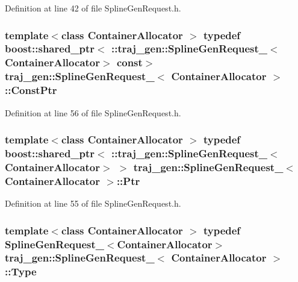 Definition at line 42 of file Spline\+Gen\+Request.\+h.

\subsubsection[{\texorpdfstring{Const\+Ptr}{ConstPtr}}]{\setlength{\rightskip}{0pt plus 5cm}template$<$class Container\+Allocator $>$ typedef boost\+::shared\+\_\+ptr$<$ \+::{\bf traj\+\_\+gen\+::\+Spline\+Gen\+Request\+\_\+}$<$Container\+Allocator$>$ const$>$ {\bf traj\+\_\+gen\+::\+Spline\+Gen\+Request\+\_\+}$<$ Container\+Allocator $>$\+::{\bf Const\+Ptr}}\hypertarget{structtraj__gen_1_1_spline_gen_request___a258449232931253cfcdc867697a26c0d}{}\label{structtraj__gen_1_1_spline_gen_request___a258449232931253cfcdc867697a26c0d}


Definition at line 56 of file Spline\+Gen\+Request.\+h.

\subsubsection[{\texorpdfstring{Ptr}{Ptr}}]{\setlength{\rightskip}{0pt plus 5cm}template$<$class Container\+Allocator $>$ typedef boost\+::shared\+\_\+ptr$<$ \+::{\bf traj\+\_\+gen\+::\+Spline\+Gen\+Request\+\_\+}$<$Container\+Allocator$>$ $>$ {\bf traj\+\_\+gen\+::\+Spline\+Gen\+Request\+\_\+}$<$ Container\+Allocator $>$\+::{\bf Ptr}}\hypertarget{structtraj__gen_1_1_spline_gen_request___a099311245799078bf44ec6e87e027ea3}{}\label{structtraj__gen_1_1_spline_gen_request___a099311245799078bf44ec6e87e027ea3}


Definition at line 55 of file Spline\+Gen\+Request.\+h.

\subsubsection[{\texorpdfstring{Type}{Type}}]{\setlength{\rightskip}{0pt plus 5cm}template$<$class Container\+Allocator $>$ typedef {\bf Spline\+Gen\+Request\+\_\+}$<$Container\+Allocator$>$ {\bf traj\+\_\+gen\+::\+Spline\+Gen\+Request\+\_\+}$<$ Container\+Allocator $>$\+::{\bf Type}}\hypertarget{structtraj__gen_1_1_spline_gen_request___aa8239a7478db4d96944122430fd1ab3f}{}\label{structtraj__gen_1_1_spline_gen_request___aa8239a7478db4d96944122430fd1ab3f}


